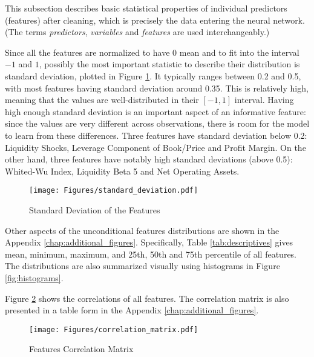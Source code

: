 		This subsection describes basic statistical properties of individual predictors (features) after cleaning, which is precisely the data entering the neural network. (The terms \textit{predictors}, \textit{variables} and \textit{features} are used interchangeably.) 
		 
		Since all the features are normalized to have 0 mean and to fit into the interval $-1$ and $1$, possibly the most important statistic to describe their distribution is standard deviation, plotted in Figure \ref{fig:standard_deviation}. It typically ranges between 0.2 and 0.5, with most features having standard deviation around 0.35. This is relatively high, meaning that the values are well-distributed in their $[-1,1]$ interval. Having high enough standard deviation is an important aspect of an informative feature: since the values are very different across observations, there is room for the model to learn from these differences. Three features have standard deviation below 0.2: Liquidity Shocks, Leverage Component of Book/Price and Profit Margin. On the other hand, three features have notably high standard deviations (above 0.5): Whited-Wu Index, Liquidity Beta 5 and Net Operating Assets. 
		
		\begin{center}
			\begin{figure}
				\texttt{[image: Figures/standard\_deviation.pdf]}
				\caption{Standard Deviation of the Features}
				\label{fig:standard_deviation}
			\end{figure}
		\end{center}
		
		Other aspects of the unconditional features distributions are shown in the Appendix \ref{chap:additional_figures}. Specifically, Table \ref{tab:descriptives} gives mean, minimum, maximum, and 25th, 50th and 75th percentile of all features. The distributions are also summarized visually using histograms in Figure \ref{fig:histograms}.  
	
			
		Figure \ref{fig:correlation_matrix} shows the correlations of all features. The correlation matrix is also presented in a table form in the Appendix \ref{chap:additional_figures}.
		
		\begin{center}
			\begin{figure}
				\texttt{[image: Figures/correlation\_matrix.pdf]}
				\caption{Features Correlation Matrix}
				\label{fig:correlation_matrix}
			\end{figure}
		\end{center}
		
